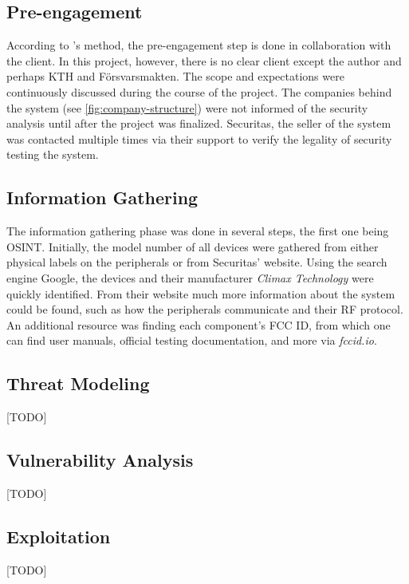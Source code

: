 \subsection{Pre-engagement}
According to \citeauthor{weidman2014}'s method, the pre-engagement step is done in collaboration with the client. In this project, however, there is no clear client except the author and perhaps KTH and Försvarsmakten. The scope and expectations were continuously discussed during the course of the project. The companies behind the system (see \ref{fig:company-structure}) were not informed of the security analysis until after the project was finalized. Securitas, the seller of the system was contacted multiple times via their support to verify the legality of security testing the system.

\subsection{Information Gathering}
The information gathering phase was done in several steps, the first one being \gls{OSINT}. Initially, the model number of all devices were gathered from either physical labels on the peripherals or from Securitas' website. Using the search engine Google, the devices and their manufacturer \textit{Climax Technology} were quickly identified. From their website much more information about the system could be found, such as how the peripherals communicate and their \gls{RF} protocol. An additional resource was finding each component's FCC ID, from which one can find user manuals, official testing documentation, and more via \textit{fccid.io}.

\subsection{Threat Modeling} \label{ch:method:threat-modeling}
[TODO]

\subsection{Vulnerability Analysis}
[TODO]

\subsection{Exploitation}
[TODO]

